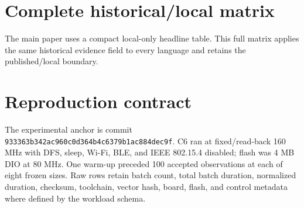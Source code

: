 \documentclass[10pt]{article}
\begin{document}
\section{Complete historical/local matrix}
The main paper uses a compact local-only headline table. This full matrix applies the same historical evidence field to every language and retains the published/local boundary.
\small\normalsize

\section{Reproduction contract}
The experimental anchor is commit \texttt{933363b342ac960c0d364b4c6379b1ac884dec9f}. C6 ran at fixed/read-back 160 MHz with DFS, sleep, Wi-Fi, BLE, and IEEE 802.15.4 disabled; flash was 4 MB DIO at 80 MHz. One warm-up preceded 100 accepted observations at each of eight frozen sizes. Raw rows retain batch count, total batch duration, normalized duration, checksum, toolchain, vector hash, board, flash, and control metadata where defined by the workload schema.
\end{document}
